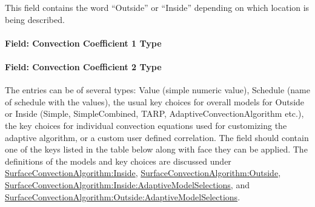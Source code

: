 This field contains the word ``Outside'' or ``Inside'' depending on which location is being described.

\paragraph{Field: Convection Coefficient 1 Type}\label{field-convection-coefficient-1-type}

\paragraph{Field: Convection Coefficient 2 Type}\label{field-convection-coefficient-2-type}

The entries can be of several types: Value (simple numeric value), Schedule (name of schedule with the values), the usual key choices for overall models for Outside or Inside (Simple, SimpleCombined, TARP, AdaptiveConvectionAlgorithm etc.), the key choices for individual convection equations used for customizing the adaptive algorithm, or a custom user defined correlation. The field should contain one of the keys listed in the table below along with face they can be applied. The definitions of the models and key choices are discussed under \hyperref[surfaceconvectionalgorithminside]{SurfaceConvectionAlgorithm:Inside}, \hyperref[surfaceconvectionalgorithmoutside]{SurfaceConvectionAlgorithm:Outside}, \hyperref[surfaceconvectionalgorithminsideadaptivemodelselections]{SurfaceConvectionAlgorithm:Inside:AdaptiveModelSelections}, and \hyperref[surfaceconvectionalgorithmoutsideadaptivemodelselections]{SurfaceConvectionAlgorithm:Outside:AdaptiveModelSelections}.

